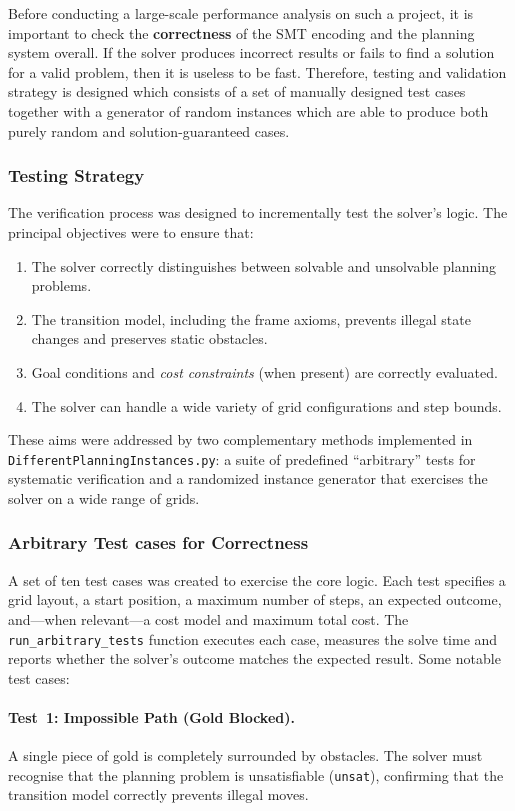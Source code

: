 \documentclass[12pt, a4paper, oneside]{report} %
\begin{document}
Before conducting a large-scale performance analysis on such a project, it is important to check the \textbf{correctness} of the SMT encoding and the planning system overall. If the solver produces incorrect results or fails to find a solution for a valid problem, then it is useless to be fast. Therefore, testing and validation strategy is designed which consists of a set of manually designed test cases together with a generator of random instances which are able to produce both purely random and solution-guaranteed cases.
\subsubsection{Testing Strategy}

The verification process was designed to incrementally test the solver’s logic. The principal objectives were to ensure that:
\begin{enumerate}
    \item The solver correctly distinguishes between solvable and unsolvable planning problems.
    \item The transition model, including the frame axioms, prevents illegal state changes and preserves static obstacles.
    \item Goal conditions and \emph{cost constraints} (when present) are correctly evaluated.
    \item The solver can handle a wide variety of grid configurations and step bounds.
\end{enumerate}
These aims were addressed by two complementary methods implemented in \\ \texttt{DifferentPlanningInstances.py}: a suite of predefined “arbitrary” tests for systematic verification and a randomized instance generator that exercises the solver on a wide range of grids.
\subsubsection{Arbitrary Test cases for Correctness}

A set of ten test cases was created to exercise the core logic. Each test specifies a grid layout, a start position, a maximum number of steps, an expected outcome, and—when relevant—a cost model and maximum total cost. The \texttt{run\_arbitrary\_tests} function executes each case, measures the solve time and reports whether the solver’s outcome matches the expected result. Some notable test cases:

\paragraph{Test 1: Impossible Path (Gold Blocked).}
A single piece of gold is completely surrounded by obstacles. The solver must recognise that the planning problem is unsatisfiable (\texttt{unsat}), confirming that the transition model correctly prevents illegal moves.
\end{document}
